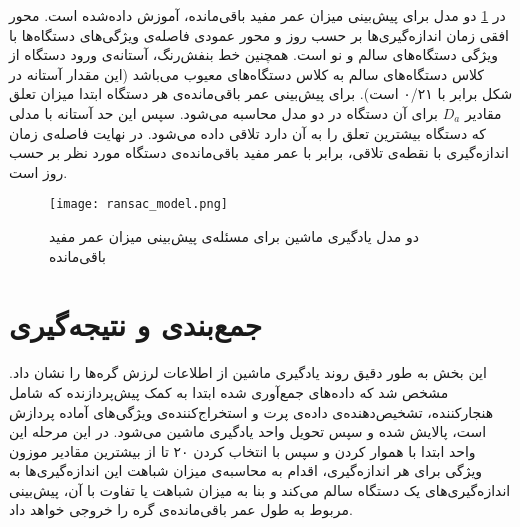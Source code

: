 در \cref{fig:ransac_model}\cite{jung2017vibration} دو مدل برای پیش‌بینی میزان عمر مفید باقی‌مانده، آموزش داده‌شده است. محور افقی زمان اندازه‌گیری‌ها بر حسب روز و محور عمودی فاصله‌ی ویژگی‌های دستگاه‌ها با ویژگی دستگاه‌های سالم و نو است. همچنین خط بنفش‌رنگ، آستانه‌ی ورود دستگاه از کلاس دستگاه‌های سالم به کلاس دستگاه‌های معیوب می‌باشد (این مقدار آستانه در شکل برابر با ۰/۲۱ است). برای پیش‌بینی عمر باقی‌مانده‌ی هر دستگاه ابتدا میزان تعلق مقادیر $D_a$ برای آن دستگاه در دو مدل محاسبه می‌شود. سپس این حد آستانه با مدلی که دستگاه بیشترین تعلق را به آن دارد تلاقی داده می‌شود. در نهایت فاصله‌ی زمان اندازه‌گیری با نقطه‌ی تلاقی، برابر با عمر مفید باقی‌مانده‌ی دستگاه مورد نظر بر حسب روز است.

\begin{figure}[!h]
\centerline{\texttt{[image: ransac\_model.png]}}
\caption{دو مدل یادگیری ماشین برای مسئله‌ی پیش‌بینی میزان عمر مفید باقی‌مانده\cite{jung2017vibration}}
\label{fig:ransac_model}
\end{figure}

\section{جمع‌بندی و نتیجه‌گیری}
این بخش به طور دقیق روند یادگیری ماشین از اطلاعات لرزش گره‌ها را نشان داد. مشخص شد که داده‌های جمع‌آوری شده ابتدا به کمک پیش‌پردازنده که شامل هنجارکننده، تشخیص‌دهنده‌ی داده‌ی پرت و استخراج‌کننده‌ی ویژگی‌های آماده پردازش است، پالایش شده و سپس تحویل واحد یادگیری ماشین می‌شود. در این مرحله این واحد ابتدا با هموار کردن و سپس با انتخاب کردن ۲۰ تا از بیشترین مقادیر موزون ویژگی  برای هر اندازه‌گیری، اقدام به محاسبه‌ی میزان شباهت این اندازه‌گیری‌ها به اندازه‌گیری‌های یک دستگاه سالم می‌کند و بنا به میزان شباهت یا تفاوت با آن، پیش‌بینی مربوط به طول عمر باقی‌مانده‌ی گره را خروجی خواهد داد.